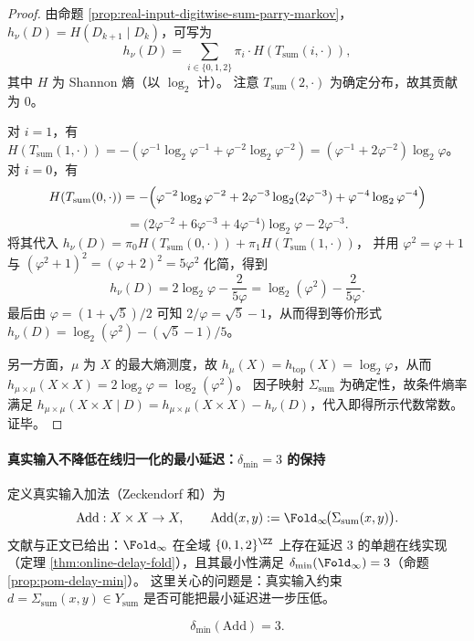 \begin{proof}
由命题 \ref{prop:real-input-digitwise-sum-parry-markov}，$h_\nu(D)=H(D_{k+1}\mid D_k)$，可写为
\[
h_\nu(D)=\sum_{i\in\{0,1,2\}}\pi_i\cdot H\!\left(T_{\mathrm{sum}}(i,\cdot)\right),
\]
其中 $H$ 为 Shannon 熵（以 $\log_2$ 计）。
注意 $T_{\mathrm{sum}}(2,\cdot)$ 为确定分布，故其贡献为 $0$。

对 $i=1$，有
\(
H(T_{\mathrm{sum}}(1,\cdot))=-(\varphi^{-1}\log_2\varphi^{-1}+\varphi^{-2}\log_2\varphi^{-2})
=(\varphi^{-1}+2\varphi^{-2})\log_2\varphi
\)。
对 $i=0$，有
\[
H(T_{\mathrm{sum}}(0,\cdot))
=-\Bigl(\varphi^{-2}\log_2\varphi^{-2}+2\varphi^{-3}\log_2(2\varphi^{-3})+\varphi^{-4}\log_2\varphi^{-4}\Bigr)
\]
\[
=\bigl(2\varphi^{-2}+6\varphi^{-3}+4\varphi^{-4}\bigr)\log_2\varphi-2\varphi^{-3}.
\]
将其代入 $h_\nu(D)=\pi_0H(T_{\mathrm{sum}}(0,\cdot))+\pi_1H(T_{\mathrm{sum}}(1,\cdot))$，
并用 $\varphi^2=\varphi+1$ 与
\(
(\varphi^2+1)^2=(\varphi+2)^2=5\varphi^2
\)
化简，得到
\[
h_\nu(D)=2\log_2\varphi-\frac{2}{5\varphi}
=\log_2(\varphi^2)-\frac{2}{5\varphi}.
\]
最后由 $\varphi=(1+\sqrt5)/2$ 可知 $2/\varphi=\sqrt5-1$，从而得到等价形式
\(
h_\nu(D)=\log_2(\varphi^2)-(\sqrt5-1)/5
\)。

另一方面，$\mu$ 为 $X$ 的最大熵测度，故 $h_\mu(X)=h_{\mathrm{top}}(X)=\log_2\varphi$，从而
\(
h_{\mu\times\mu}(X\times X)=2\log_2\varphi=\log_2(\varphi^2)
\)。
因子映射 $\Sigma_{\mathrm{sum}}$ 为确定性，故条件熵率满足
\(
h_{\mu\times\mu}(X\times X\mid D)=h_{\mu\times\mu}(X\times X)-h_\nu(D)
\)，代入即得所示代数常数。证毕。
\end{proof}

\paragraph{真实输入不降低在线归一化的最小延迟：\texorpdfstring{$\delta_{\min}=3$}{delta=3} 的保持}
定义真实输入加法（Zeckendorf 和）为
\[
\mathrm{Add}:X\times X\to X,\qquad
\mathrm{Add}(x,y):=\Fold_\infty\!\bigl(\Sigma_{\mathrm{sum}}(x,y)\bigr).
\]
文献与正文已给出：$\Fold_\infty$ 在全域 $\{0,1,2\}^{\ZZ}$ 上存在延迟 $3$ 的单趟在线实现（定理 \ref{thm:online-delay-fold}），且其最小性满足 $\delta_{\min}(\Fold_\infty)=3$（命题 \ref{prop:pom-delay-min}）。
这里关心的问题是：真实输入约束 $d=\Sigma_{\mathrm{sum}}(x,y)\in Y_{\mathrm{sum}}$ 是否可能把最小延迟进一步压低。

\begin{proposition}\label{prop:real-input-add-delay-rigidity}
\[
\delta_{\min}(\mathrm{Add})=3.
\]
\end{proposition}

